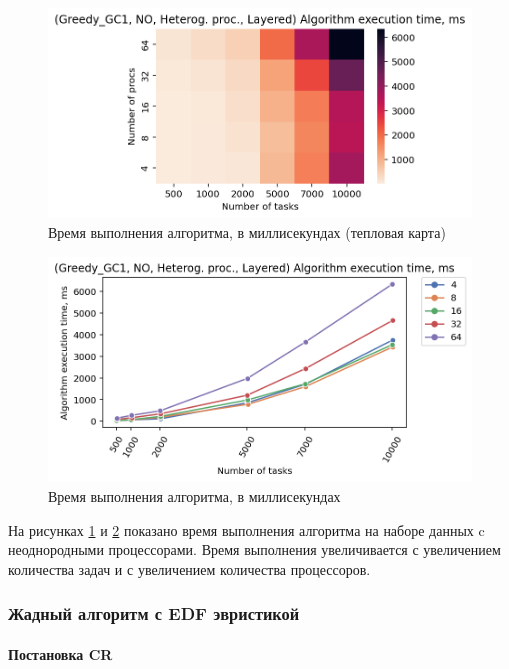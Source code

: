\begin{figure}[!htbp]
    \centering
    \includegraphics[width=\textwidth]{imgs/unbalanced/NO/et_heatmap.png}
    \caption{Время выполнения алгоритма, в миллисекундах (тепловая карта)}
    \label{fig:NO-exec-time-heatmap}
\end{figure}

\begin{figure}[!htbp]
    \centering
    \includegraphics[width=\textwidth]{imgs/unbalanced/NO/tr_graph.png}
    \caption{Время выполнения алгоритма, в миллисекундах}
    \label{fig:NO-exec-time-compiled}
\end{figure}

На рисунках \ref{fig:NO-exec-time-heatmap} и \ref{fig:NO-exec-time-compiled} показано время выполнения алгоритма на наборе данных c неоднородными процессорами. Время выполнения увеличивается с увеличением количества задач и с увеличением количества процессоров.

\subsubsection{Жадный алгоритм с EDF эвристикой}

\paragraph{Постановка CR}

